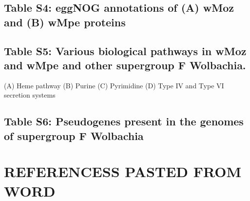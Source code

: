 \documentclass[10pt, a4paper, twocolumn]{article} %
\begin{document}
\subsection{Table S4: eggNOG annotations of (A) wMoz and (B) wMpe proteins}

\subsection{Table S5: Various biological pathways in wMoz and wMpe and other supergroup F Wolbachia.}
(A) Heme pathway (B) Purine (C) Pyrimidine (D) Type IV and Type VI secretion systems

\subsection{Table S6: Pseudogenes present in the genomes of supergroup F Wolbachia}


\section{REFERENCESS PASTED FROM WORD}
    
\end{document}
